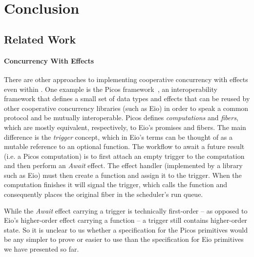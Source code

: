 \section{Conclusion}
\label{sec:conclusion}

\subsection{Related Work}
\paragraph*{Concurrency With Effects}
There are other approaches to implementing cooperative concurrency with effects even within \ocf{}.
One example is the Picos framework~\cite{Picos}, an interoperability framework that defines a small set of data types and effects that can be reused by other cooperative concurrency libraries (such as Eio)
in order to speak a common protocol and be mutually interoperable.
Picos defines \emph{computations} and \emph{fibers}, which are mostly equivalent, respectively, to Eio's promises and fibers.
The main difference is the \emph{trigger} concept, which in Eio's terms can be thought of as a mutable reference to an optional  function.
The workflow to await a future result (i.e. a Picos computation) is to first attach an empty trigger to the computation and then perform an \emph{Await} effect.
The effect handler (implemented by a library such as Eio) must then create a  function and assign it to the trigger.
When the computation finishes it will signal the trigger, which calls the  function and consequently places the original fiber in the scheduler's run queue.

While the \emph{Await} effect carrying a trigger is technically first-order -- as opposed to Eio's higher-order \esuspend{} effect carrying a  function --
a trigger still contains higher-order state.
So it is unclear to us whether a specification for the Picos primitives would be any simpler to prove or easier to use than the specification for Eio primitives we have presented so far.

